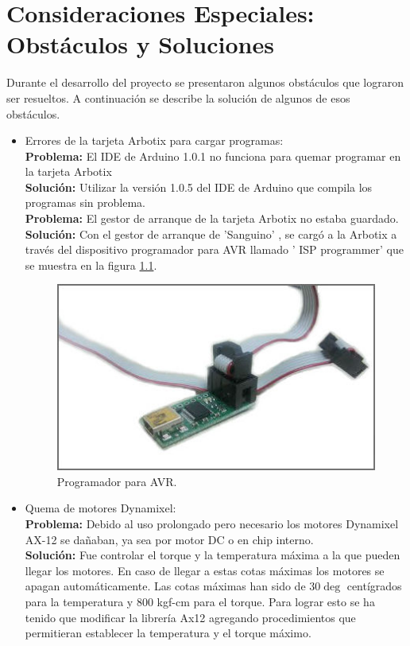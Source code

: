 \chapter{Consideraciones Especiales: Obst\'aculos y Soluciones} \label{chapter:consideraciones}

Durante el desarrollo del proyecto se presentaron algunos obst\'aculos que lograron ser resueltos. A continuación se describe la solución de algunos de esos obstáculos. 
\begin{itemize}
\item Errores de la tarjeta Arbotix para cargar programas:\\
	
	\textbf{Problema:} El IDE de Arduino 1.0.1 no funciona para quemar programar en la tarjeta Arbotix \\
  	\textbf{Soluci\'on:} Utilizar la versión 1.0.5 del IDE de Arduino  que compila los programas sin problema. \\
	

	 \textbf{Problema:} El gestor de arranque de la tarjeta Arbotix no estaba guardado.\\
	 \textbf{Soluci\'on:} Con el gestor de arranque de 'Sanguino' , se cargó a la Arbotix a través del    			    dispositivo programador para AVR llamado ' ISP programmer' que se muestra en la figura         \ref{fig:ISPprog}. 

	\begin{figure}[hbtp]
	\centering
	\includegraphics[scale=0.3]{imagenes/ISP.jpg}
	\caption{Programador para AVR.}
	\label{fig:ISPprog}
	\end{figure}
	
	

 \item Quema de motores Dynamixel:\\

	\textbf{Problema:} Debido al uso prolongado pero necesario los motores Dynamixel AX-12 se dañaban, ya sea por motor DC o en chip interno.\\
	\textbf{Soluci\'on:} Fue controlar el torque y la temperatura máxima a la que pueden llegar los motores. En caso de llegar a estas cotas máximas los motores se apagan automáticamente. Las cotas máximas han sido de $30\deg$ centígrados para la temperatura y 800 kgf-cm para el torque. Para lograr esto se ha tenido que modificar la librería Ax12 agregando procedimientos que permitieran establecer la temperatura y el torque máximo.\\


\end{itemize}
